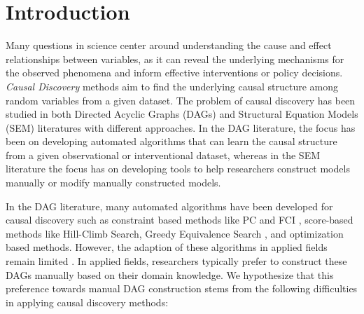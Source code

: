 \documentclass[letterpaper]{article} %
\begin{document}
\section{Introduction}

Many questions in science center around understanding the cause and effect
relationships between variables, as it can reveal the underlying mechanisms for
the observed phenomena and inform effective interventions or policy decisions.
\emph{Causal Discovery} methods aim to find the underlying causal structure
among random variables from a given dataset. The problem of causal discovery
has been studied in both Directed Acyclic Graphs (DAGs) and Structural Equation
Models (SEM) literatures with different approaches. In the DAG literature, the
focus has been on developing automated algorithms that can learn the causal
structure from a given observational or interventional dataset, whereas in the
SEM literature the focus has on developing tools to help researchers construct 
models manually or modify manually constructed models.


In the DAG literature, many automated algorithms have been developed for causal
discovery such as constraint based methods like PC \citep{Spirtes2001} and FCI
\citep{Spirtes2000}, score-based methods like Hill-Climb Search, Greedy
Equivalence Search \citep{Chickering2002}, and optimization based methods.
However, the adaption of these algorithms in applied fields remain limited
\citep{Tennant2020}. In applied fields, researchers typically prefer to
construct these DAGs manually based on their domain knowledge. We hypothesize
that this preference towards manual DAG construction stems from the following
difficulties in applying causal discovery methods:
\end{document}
